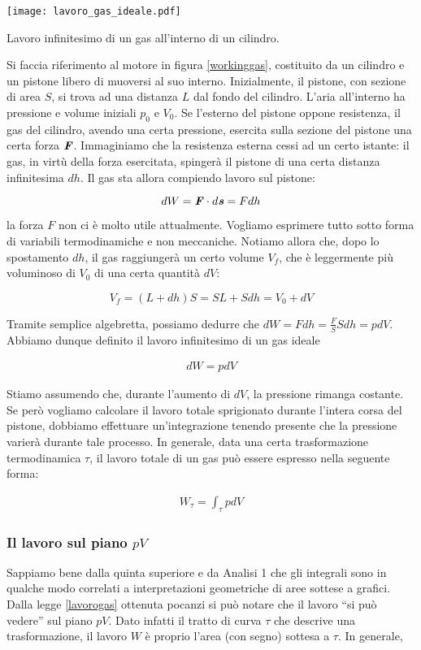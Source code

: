 \begin{marginfigure}
    \centering
    \texttt{[image: lavoro\_gas\_ideale.pdf]}
    \caption{Lavoro infinitesimo di un gas all'interno di un cilindro.}
    \label{workinggas}
\end{marginfigure}

Si faccia riferimento al motore in figura \ref{workinggas}, costituito
da un cilindro e un pistone libero di muoversi al suo interno. Inizialmente, il pistone,
con sezione di area $S$, si trova ad una distanza $L$ dal fondo del cilindro.
L'aria all'interno ha pressione e volume iniziali $p_0$ e $V_0$. Se l'esterno
del pistone oppone resistenza, il gas del cilindro, avendo una certa pressione,
esercita sulla sezione del pistone una certa forza $\textbf{\textit{F}}$. Immaginiamo
che la resistenza esterna cessi ad un certo istante: il gas, in virtù della forza
esercitata, spingerà il pistone di una certa distanza infinitesima $dh$.
Il gas sta allora compiendo lavoro sul pistone:

\[ dW = \textbf{\textit{F}} \cdot d\textbf{\textit{s}} = Fdh \]

\noindent la forza $F$ non ci è molto utile attualmente. Vogliamo esprimere
tutto sotto forma di variabili termodinamiche e non meccaniche. Notiamo
allora che, dopo lo spostamento $dh$, il gas raggiungerà un certo volume
$V_f$, che è leggermente più voluminoso di $V_0$ di una certa quantità $dV$:

\[ V_f = (L + dh)S = SL + Sdh = V_0 + dV \]

\noindent Tramite semplice algebretta, possiamo dedurre che
$dW = Fdh = \frac{F}{S}Sdh = pdV$. Abbiamo dunque definito
il lavoro infinitesimo di un gas ideale

\begin{align}
    dW = pdV
\end{align}

Stiamo assumendo che, durante l'aumento di $dV$, la pressione
rimanga costante. Se però vogliamo calcolare il lavoro totale
sprigionato durante l'intera corsa del pistone, dobbiamo effettuare
un'integrazione tenendo presente che la pressione varierà durante
tale processo. In generale, data una certa trasformazione termodinamica
$\tau$, il lavoro totale di un gas può essere espresso nella
seguente forma:

\begin{align}
    W_\tau = \int_\tau pdV\label{lavorogas}
\end{align}

\subsubsection*{Il lavoro sul piano $pV$}
Sappiamo bene dalla quinta superiore e da Analisi 1 che gli integrali
sono in qualche modo correlati a interpretazioni geometriche di aree
sottese a grafici. Dalla legge \ref{lavorogas} ottenuta pocanzi si può
notare che il lavoro ``si può vedere'' sul piano $pV$. Dato infatti
il tratto di curva $\tau$ che descrive una trasformazione, il lavoro
$W$ è proprio l'area (con segno) sottesa a $\tau$. In generale,

